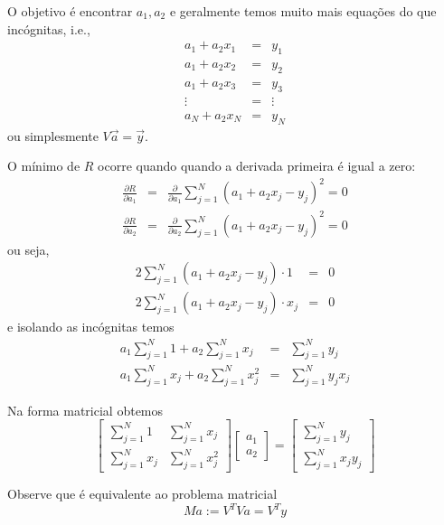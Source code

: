 O objetivo é encontrar $a_1, a_2$ e geralmente temos muito mais equações do que incógnitas, i.e.,
\begin{eqnarray*}
 a_1+a_2 x_1 &=&y_1 \\
 a_1+a_2 x_2 &=&y_2 \\
 a_1+a_2 x_3 &=&y_3 \\
  \vdots     &=& \vdots \\
 a_N+a_2 x_N &=&y_N   
\end{eqnarray*}
ou simplesmente $V\vec a= \vec y$.

O mínimo de $R$ ocorre quando quando a derivada primeira é igual a zero:
\begin{eqnarray*}
  \frac{\partial R}{\partial a_1} &=& \frac{\partial }{\partial a_1} \sum_{j=1}^N (a_1 + a_2 x_j-y_j)^2 =0 \\
  \frac{\partial R}{\partial a_2} &=& \frac{\partial }{\partial a_2} \sum_{j=1}^N (a_1 + a_2 x_j-y_j)^2 =0 
\end{eqnarray*}
ou seja,
\begin{eqnarray*}
   2 \sum_{j=1}^N (a_1 + a_2 x_j-y_j)\cdot 1 &=&0 \\
   2 \sum_{j=1}^N (a_1 + a_2 x_j-y_j)\cdot x_j &=&0 
\end{eqnarray*}
e isolando as incógnitas temos
\begin{eqnarray*}
   a_1\sum_{j=1}^N 1 + a_2 \sum_{j=1}^Nx_j &=&\sum_{j=1}^N y_j\\
   a_1\sum_{j=1}^N x_j + a_2 \sum_{j=1}^Nx_j^2 &=&\sum_{j=1}^N y_jx_j
\end{eqnarray*}

Na forma matricial obtemos
\begin{equation}
  \begin{bmatrix}
     \sum_{j=1}^N 1 &  \sum_{j=1}^N x_j \\
     \sum_{j=1}^N x_j &  \sum_{j=1}^N x_j^2 
  \end{bmatrix}
  \begin{bmatrix}
     a_1 \\
     a_2 
  \end{bmatrix}=
  \begin{bmatrix}
     \sum_{j=1}^N y_j \\
     \sum_{j=1}^N x_j y_j 
  \end{bmatrix}
\end{equation}

Observe que é equivalente ao problema matricial
\begin{equation}
   Ma := V^TV a = V^Ty
\end{equation}


